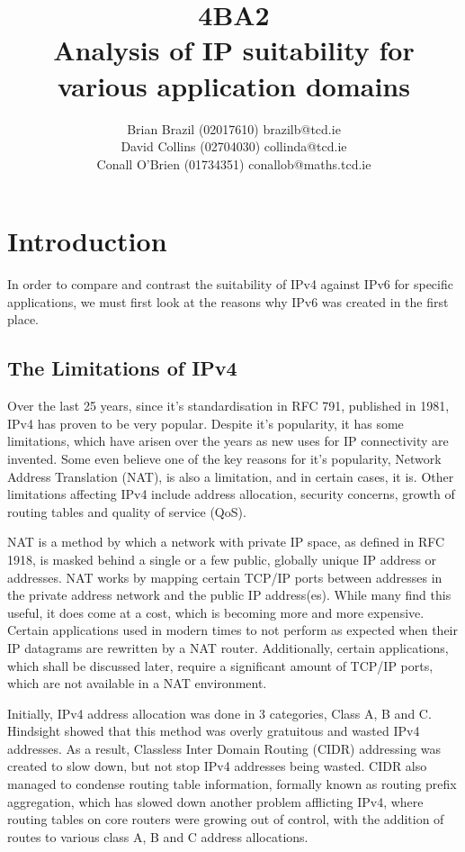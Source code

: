 \documentclass[a4paper,12pt]{article}
\begin{document}
\title{4BA2 \\ Analysis of IP suitability for various application domains}

\author{Brian Brazil (02017610) brazilb@tcd.ie \\
David Collins (02704030) collinda@tcd.ie \\ 
Conall O'Brien (01734351) conallob@maths.tcd.ie}

\maketitle

\section{Introduction}

In order to compare and contrast the suitability of IPv4 against IPv6
for specific applications, we must first look at the reasons why IPv6
was created in the first place.

\subsection{The Limitations of IPv4}

Over the last 25 years, since it's standardisation in RFC 791, published
in 1981, IPv4 has proven to be very popular. Despite it's popularity, it 
has some limitations, which have arisen over the years as new uses for 
IP connectivity are invented. Some even believe one of the key reasons
for it's popularity, Network Address Translation (NAT), is also a 
limitation, and in certain cases, it is. Other limitations
affecting IPv4 include address allocation, security concerns, growth of 
routing tables and quality of service (QoS).


NAT is a method by which a network with private IP space, as defined in
RFC 1918, is masked behind a single or a few public, globally unique IP
address or addresses. NAT works by mapping certain TCP/IP ports between
addresses in the private address network and the public IP address(es).
While many find this useful, it does come at a cost, which is becoming
more and more expensive. Certain applications used in modern times to
not perform as expected when their IP datagrams are rewritten by a NAT
router. Additionally, certain applications, which shall be discussed
later, require a significant amount of TCP/IP ports, which are not
available in a NAT environment.


Initially, IPv4 address allocation was done in 3 categories, Class A, B
and C. Hindsight showed that this method was overly gratuitous and
wasted IPv4 addresses. As a result, Classless Inter Domain Routing
(CIDR) addressing was created to slow down, but not stop IPv4 addresses
being wasted. CIDR also managed to condense routing table information,
formally known as routing prefix aggregation, which has slowed down 
another problem afflicting IPv4, where routing tables on core
routers were growing out of control, with the addition of routes to
various class A, B and C address allocations.
\end{document}
